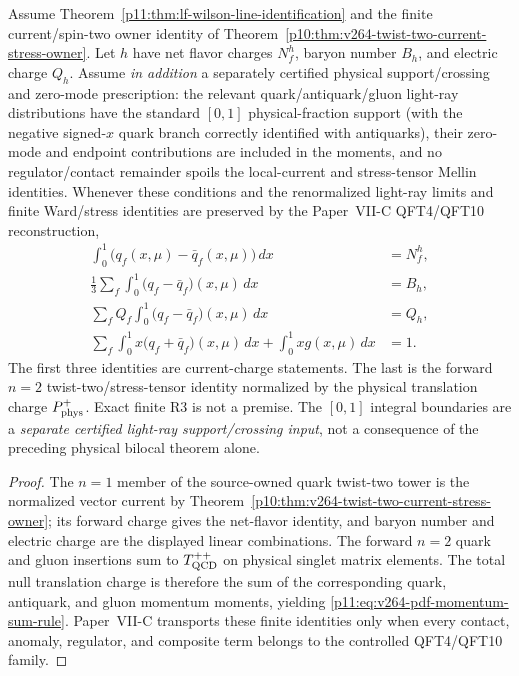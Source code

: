 \documentclass[12pt,a4paper]{article}
\begin{document}
\begin{theorem}
\label{p11:thm:native-pdf-sum-rules}
Assume Theorem~\ref{p11:thm:lf-wilson-line-identification} and the finite
current/spin-two owner identity of
Theorem~\ref{p10:thm:v264-twist-two-current-stress-owner}.  Let \(h\) have net
flavor charges \(N_f^h\), baryon number \(B_h\), and electric charge \(Q_h\).
Assume \emph{in addition} a separately certified physical support/crossing and zero-mode prescription: the relevant quark/antiquark/gluon light-ray distributions have the standard \([0,1]\) physical-fraction support (with the negative signed-$x$ quark branch correctly identified with antiquarks), their zero-mode and endpoint contributions are included in the moments, and no regulator/contact remainder spoils the local-current and stress-tensor Mellin identities. Whenever these conditions and the renormalized light-ray limits and finite Ward/stress identities
are preserved by the Paper~VII-C QFT4/QFT10 reconstruction,
\begin{align}
\label{p11:eq:v264-pdf-net-flavor-sum-rule}
 \int_0^1\!\bigl(q_f(x,\mu)-\bar q_f(x,\mu)\bigr)\,dx&=N_f^h,\\
\label{p11:eq:v264-pdf-baryon-sum-rule}
 \frac13\sum_f\int_0^1\!\bigl(q_f-\bar q_f\bigr)(x,\mu)\,dx&=B_h,\\
\label{p11:eq:v264-pdf-charge-sum-rule}
 \sum_f Q_f\int_0^1\!\bigl(q_f-\bar q_f\bigr)(x,\mu)\,dx&=Q_h,\\
\label{p11:eq:v264-pdf-momentum-sum-rule}
 \sum_f\int_0^1\!x\bigl(q_f+\bar q_f\bigr)(x,\mu)\,dx
 +\int_0^1\!xg(x,\mu)\,dx&=1.
\end{align}
The first three identities are current-charge statements.  The last is the
forward \(n=2\) twist-two/stress-tensor identity normalized by the physical
translation charge \(P_{\rm phys}^+\).  Exact finite R3 is not a premise. The \([0,1]\) integral boundaries are a \emph{separate certified light-ray support/crossing input}, not a consequence of the preceding physical bilocal theorem alone.
\end{theorem}
\begin{proof}
The \(n=1\) member of the source-owned quark twist-two tower is the normalized
vector current by Theorem~\ref{p10:thm:v264-twist-two-current-stress-owner}; its
forward charge gives the net-flavor identity, and baryon number and electric
charge are the displayed linear combinations.  The forward \(n=2\) quark and
gluon insertions sum to \(T^{++}_{\rm QCD}\) on physical singlet matrix elements.
The total null translation charge is therefore the sum of the corresponding
quark, antiquark, and gluon momentum moments, yielding
\eqref{p11:eq:v264-pdf-momentum-sum-rule}.  Paper~VII-C transports these finite
identities only when every contact, anomaly, regulator, and composite term
belongs to the controlled QFT4/QFT10 family.
\end{proof}
\end{document}

